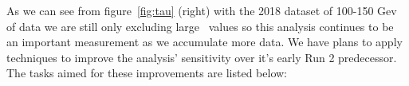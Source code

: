 As we can see from figure~\ref{fig:tau} (right) with the 2018 dataset of 100-150 Gev of data we are still only excluding large \tanb\ values so this analysis continues to be an important measurement as we accumulate more data.
We have plans to apply techniques to improve the analysis' sensitivity over it's early Run 2 predecessor.  The tasks aimed for these improvements are listed below:





